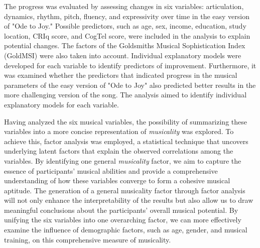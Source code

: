 The progress was evaluated by assessing changes in six variables: articulation, dynamics, rhythm, pitch, fluency, and expressivity over time in the easy version of "Ode to Joy." Possible predictors, such as age, sex, income, education, study location, CRIq score, and CogTel score, were included in the analysis to explain potential changes. The factors of the Goldsmiths Musical Sophistication Index (GoldMSI) were also taken into account. Individual explanatory models were developed for each variable to identify predictors of improvement. Furthermore, it was examined whether the predictors that indicated progress in the musical parameters of the easy version of "Ode to Joy" also predicted better results in the more challenging version of the song. The analysis aimed to identify individual explanatory models for each variable. 

Having analyzed the six musical variables, the possibility of summarizing these variables into a more concise representation of \textit{musicality} was explored. To achieve this, factor analysis was employed, a statistical technique that uncovers underlying latent factors that explain the observed correlations among the variables. By identifying one general \textit{musicality} factor, we aim to capture the essence of participants' musical abilities and provide a comprehensive understanding of how these variables converge to form a cohesive musical aptitude. The generation of a general musicality factor through factor analysis will not only enhance the interpretability of the results but also allow us to draw meaningful conclusions about the participants' overall musical potential. By unifying the six variables into one overarching factor, we can more effectively examine the influence of demographic factors, such as age, gender, and musical training, on this comprehensive measure of musicality.



